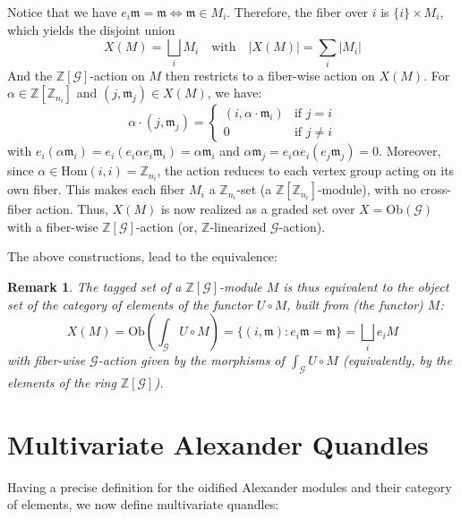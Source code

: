 \documentclass[a4paper,12pt]{article}
\newtheorem{remark}{Remark}[section]
\newcommand{\Z}{\mathbb{Z}}
\newcommand{\calG}{\mathcal{G}}
\newcommand{\Ob}{\mathrm{Ob}}
\newcommand{\Hom}{\mathrm{Hom}}
\newcommand{\Set}{\mathbf{Set}}
\newcommand{\Gint}[1]{\int_{#1}}
\newcommand{\m}{\mathfrak{m}}
\begin{document}
Notice that we have $e_i \m = \m \iff \m \in M_i$. Therefore, the fiber over $i$ is $\{i\} \times M_i$, which yields the disjoint union   
\[
  X(M) = \bigsqcup_i M_i   \quad \text{with} \quad  |X(M)| = \sum_i |M_i|  
\]
And the $\Z[\calG]$-action on $M$ then restricts to a fiber-wise action on $X(M)$. For  $\alpha \in  \Z[\Z_{n_i}]$ and $(j, \m_j) \in X(M)$, we have: 
\[
  \alpha \cdot (j, \m_j) =
  \begin{cases}
    (i,  \alpha \cdot  \m_i) & \text{if } j = i  \\
    0         &  \text{if } j \neq i
  \end{cases}
\]
with $e_i (\alpha \m_i) = e_i (e_i \alpha e_i \m_i)  = \alpha \m_i$ and  $\alpha \m_j = e_i \alpha e_i (e_j \m_j)  = 0$.  Moreover, since $\alpha \in \Hom(i,i) = \Z_{n_i}$,  the action reduces to each vertex group acting on its own fiber.  
This makes each fiber $M_i$ a $\Z_{n_i}$-set (a $\Z[\Z_{n_i}]$-module), with no cross-fiber action. Thus, $X(M)$ is now realized as a graded set over $X = \Ob(\calG)$ with a fiber-wise $\Z[\calG]$-action (or, $\Z$-linearized $\calG$-action).

The above constructions, lead to the equivalence: 
\begin{remark}
 The tagged set of a $\Z[\calG]$-module $M$ is thus equivalent to the object set of the category of elements of the functor $U \circ M$, built from (the functor) $M$:    
\[
  X(M)
  = \Ob\!\left(\Gint{\calG} U \circ M\right)
  = \{(i, \m) : e_i \m = \m\}
  = \bigsqcup_i e_i M  
\]
with fiber-wise $\calG$-action given by the morphisms of  $\Gint{\calG} U \circ M$ (equivalently, by the elements of the ring $\Z[\calG]$).   
\end{remark}
 

\section{Multivariate Alexander Quandles}

Having a precise definition for the oidified Alexander modules and their category of elements, we now define multivariate quandles:    
\end{document}
